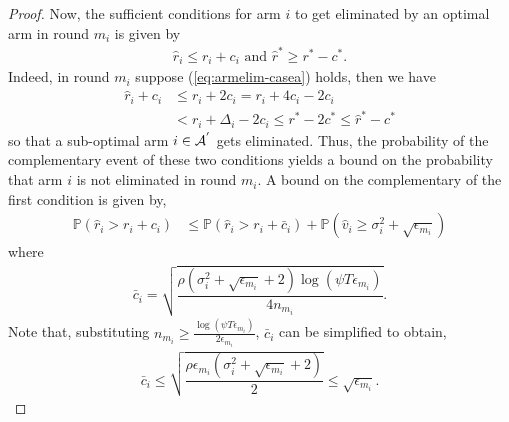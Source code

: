 \begin{proof}
Now, the sufficient conditions for arm $i$ to get eliminated by an optimal arm in round $m_i$ is given by
	\begin{eqnarray}
	\hat{r}_{i} \leq r_{i} + c_{i} \text{ and } \label{eq:armelim-casea}
 	\hat{r}^{*} \geq r^{*} - c^{*}.
	\end{eqnarray}
Indeed, in round $m_i$ suppose (\ref{eq:armelim-casea}) holds, then we have
%	 
  \begin{align*}
\hat{r}_{i} + c_{i}&\leq r_{i} + 2c_{i} 
= r_{i} + 4c_{i} - 2c_{i} \\
 &< r_{i} + \Delta_{i} - 2c_{i}
 \leq r^{*} -2c^{*} 
 \leq \hat{r}^{*} - c^{*}
  \end{align*}
  so that a sub-optimal arm ${i} \in \mathcal{A}^{'}$ gets eliminated.	
Thus, the probability of the complementary event of these two conditions yields a bound on the probability that arm $i$ is not eliminated in round $m_i$. A bound on the complementary of the first condition is given by,
\begin{align}
\mathbb{P}(\hat{r}_{i}> r_{i} + c_{i})
&\leq \mathbb{P}\left( \hat{r}_{i} > r_{i}+ \bar{c}_i\right) 
+ \mathbb{P}\left( \hat{v}_{i}\geq \sigma_{i}^{2}+\sqrt{\epsilon_{m_{i}}}\right)\label{eq:prob_eq2}
\end{align}
where 
\begin{align*}
\bar{c}_i=\sqrt{\dfrac{\rho (\sigma_{i}^{2}+\sqrt{\epsilon_{m_{i}}} + 2)\log(\psi T\epsilon_{m_{i}})}{4n_{m_i}}}.
\end{align*}
Note that, substituting $ n_{m_i} \geq \frac{\log{(\psi T\epsilon_{m_{i}})}}{2\epsilon_{m_{i}}}$, $\bar{c}_i$ can be simplified to obtain,
\begin{align}
\bar{c}_i
\leq \sqrt{\dfrac{\rho\epsilon_{m_{i}}(\sigma_{i}^{2}+\sqrt{\epsilon_{m_{i}}} + 2)}{2}}\leq \sqrt{ \epsilon_{m_{i}}}.
\label{si_bar_equn}
\end{align}

\end{proof}
